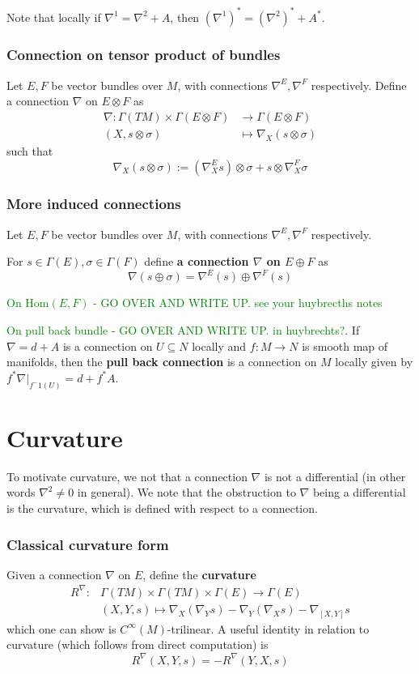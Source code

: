 \documentclass[a4paper]{article}
\theoremstyle{definition} \newtheorem*{definition}{Definition}
\theoremstyle{definition} \newtheorem*{definitions}{Definitions}
\theoremstyle{plain} \newtheorem{theorem}{Theorem}[section]
\theoremstyle{plain} \newtheorem{proposition}[theorem]{Proposition}
\theoremstyle{plain} \newtheorem{corollary}[theorem]{Corollary}
\theoremstyle{plain} \newtheorem{lemma}[theorem]{Lemma}
\theoremstyle{plain} \newtheorem{example}[theorem]{Example}
\newcommand{\finish}[1]{\textcolor{green}{#1}}
\newcommand{\defn}[1]{\textbf{#1}}
\newcommand{\Hom}{\text{Hom}}
\newcommand{\smooth}{C^\infty}
\begin{document}
Note that locally if $\nabla^1 = \nabla^2 + A$, then $(\nabla^1)^* = (\nabla^2)^* + A^*$.

\subsubsection{Connection on tensor product of bundles}
Let $E, F$ be vector bundles over $M$, with connections $\nabla^E, \nabla^F$ respectively.
Define a connection $\nabla$ on $E\otimes F$ as
\begin{align*}
    \nabla : \Gamma(TM)\times \Gamma(E\otimes F) & \to \Gamma(E\otimes F) \\
    (X, s\otimes \sigma) & \mapsto \nabla_X(s\otimes \sigma)
\end{align*}
such that
$$\nabla_X(s\otimes \sigma):=(\nabla^E_X s)\otimes \sigma + s \otimes \nabla^F_X \sigma $$

\subsubsection{More induced connections}
Let $E, F$ be vector bundles over $M$, with connections $\nabla^E, \nabla^F$ respectively. 

For $s\in \Gamma(E), \sigma \in \Gamma(F)$ define \defn{a connection $\nabla$ on $E\oplus F$} as
$$\nabla(s\oplus \sigma)=\nabla^E(s)\oplus \nabla^F(s)$$

\finish{On $\Hom(E, F)$ - GO OVER AND WRITE UP. see your huybrecths notes} 

\finish{On pull back bundle - GO OVER AND WRITE UP. in huybrechts?}. If $\nabla = d+A$ is a connection on $U\subseteq N$ locally and $f:M\to N$ is smooth map of manifolds, then the \defn{pull back connection} is a connection on $M$ locally given by $f^*\nabla |_{f^-1(U)}=d+f^*A$.

\section{Curvature}

To motivate curvature, we not that a connection $\nabla$ is not a differential (in other words $\nabla^2\neq 0$ in general). We note that the obstruction to $\nabla$ being a differential is the curvature, which is defined with respect to a connection. 

\subsubsection{Classical curvature form}
Given a connection $\nabla$ on $E$, define the \defn{curvature}
\begin{align*}
R^\nabla : & \Gamma(TM)\times \Gamma(TM)\times \Gamma(E)\to \Gamma(E) \\
& (X, Y, s) \mapsto \nabla_X(\nabla_Y s) - \nabla_Y(\nabla_X s) - \nabla_{[X, Y]} s
\end{align*}
which one can show is $\smooth (M)$-trilinear.
A useful identity in relation to curvature (which follows from direct computation) is
$$R^\nabla (X, Y, s)=-R^\nabla (Y, X, s)$$
\end{document}
